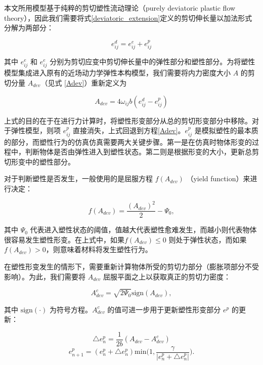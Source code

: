 本文所用模型基于纯粹的剪切塑性流动理论（purely deviatoric plastic flow theory），因此我们需要将式\ref{deviatoric_extension}定义的剪切伸长量以加法形式分解为两部分：

\begin{equation}
e_{ij}^d = e_{ij}^e+e_{ij}^p
\end{equation}

其中 $e_{ij}^e$ 和 $e_{ij}^e$ 分别为剪切应变中剪切伸长量中的弹性部分和塑性部分。为将塑性模型集成进入原有的近场动力学弹性本构模型，我们需要将内力密度大小 $A$ 的剪切分量 $A_{dev}$（见式 \ref{Adev}）重新定义为

\begin{equation}
A_{dev} = 4\omega_{ij}b(e_{ij}^d-e_{ij}^p)
\end{equation}

上式的目的在于在进行力计算时，将塑性形变部分从总的剪切形变部分中移除。对于弹性模型，则项 $e_{ij}^p$ 直接消失，上式回退到方程\ref{Adev}。$e_{ij}^p$ 是模拟塑性的最本质的部分，而塑性行为的仿真仿真需要两大关键步骤。第一是在仿真时物体形变的过程中，判断物体是否由弹性进入到塑性状态。第二则是根据形变的大小，更新总剪切形变中的塑性部分。

对于判断塑性是否发生，一般使用的是屈服方程 $f(A_{dev})$ （yield function）来进行决定：

\begin{equation}
f(A_{dev}) = \frac{(A_{dev})^2}{2}-\Psi_0,
\end{equation}

其中 $\Psi_0$ 代表进入塑性状态的阈值，值越大代表塑性愈难发生，而越小则代表物体很容易发生塑性形变。在上式中，如果$f(A_{dev})\leq 0$ 则处于弹性状态，而如果 $f(A_{dev}) > 0$，则意味着材料将发生塑性行为。

在塑性形变发生的情形下，需要重新计算物体所受的剪切力部分（膨胀项部分不受影响）。为此，我们需要将 $A_{dev}$ 屈服平面之上以获取真正的剪切力密度：

\begin{equation}
A_{dev}^c=\sqrt{2\Psi_0}\mathrm{sign}(A_{dev}),
\end{equation}

其中 $\mathrm{sign}(\cdot)$ 为符号方程。$A_{dev}^c$ 的值可进一步用于更新塑性形变部分 $e^p$ 的更新：

\begin{equation}
\triangle e_n^p = \frac{1}{2b}(A_{dev}-A_{dev}^c)
\end{equation}
\begin{equation}
e_{n+1}^p = (e_n^p+\triangle e_n^p)\mathrm{min}\big(1,\frac{\gamma}{|e_n^p+\triangle e_n^p|}\big).
\end{equation}


